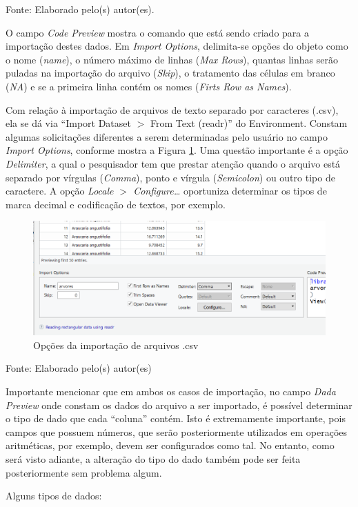 \documentclass[12pt,brazil,]{book}
\begin{document}
Fonte: Elaborado pelo(s) autor(es).

O campo \emph{Code Preview} mostra o comando que está sendo criado para
a importação destes dados. Em \emph{Import Options}, delimita-se opções
do objeto como o nome (\emph{name}), o número máximo de linhas
(\emph{Max Rows}), quantas linhas serão puladas na importação do arquivo
(\emph{Skip}), o tratamento das células em branco (\emph{NA}) e se a
primeira linha contém os nomes (\emph{Firts Row as Names}).

Com relação à importação de arquivos de texto separado por caracteres
(.csv), ela se dá via ``Import Dataset \(>\) From Text (readr)'' do
Environment. Constam algumas solicitações diferentes a serem
determinadas pelo usuário no campo \emph{Import Options}, conforme
mostra a Figura \ref{fig:r4csv}. Uma questão importante é a opção
\emph{Delimiter}, a qual o pesquisador tem que prestar atenção quando o
arquivo está separado por vírgulas (\emph{Comma}), ponto e vírgula
(\emph{Semicolon}) ou outro tipo de caractere. A opção \emph{Locale
\(>\) Configure\ldots{}} oportuniza determinar os tipos de marca decimal
e codificação de textos, por exemplo.

\begin{figure}

{\centering \includegraphics[width=0.6\linewidth]{r4csv} 

}

\caption{Opções da importação de arquivos .csv}\label{fig:r4csv}
\end{figure}

Fonte: Elaborado pelo(s) autor(es)

Importante mencionar que em ambos os casos de importação, no campo
\emph{Dada Preview} onde constam os dados do arquivo a ser importado, é
possível determinar o tipo de dado que cada ``coluna'' contém. Isto é
extremamente importante, pois campos que possuem números, que serão
posteriormente utilizados em operações aritméticas, por exemplo, devem
ser configurados como tal. No entanto, como será visto adiante, a
alteração do tipo do dado também pode ser feita posteriormente sem
problema algum.

Alguns tipos de dados:
\end{document}
